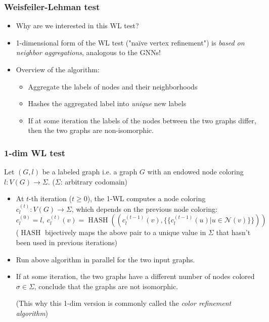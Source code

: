 \documentclass[handout]{beamer}
\DeclareMathOperator{\hash}{HASH}
\begin{document}
\begin{frame}
\frametitle{Weisfeiler-Lehman test}

\begin{itemize}
	\item Why are we interested in this WL test? \pause
	
	\item 1-dimensional form of the WL test ("na\"ive vertex refinement") is {\it based on neighbor aggregations}, analogous to the GNNs! \pause
	
	\item Overview of the algorithm:
	\begin{itemize}
		\item Aggregate the labels of nodes and their neighborhoods
		\item Hashes the aggregated label into {\it unique} new labels
		\item If at some iteration the labels of the nodes between the two graphs differ, then the two graphs are non-isomorphic.
	\end{itemize}
	
\end{itemize}

\end{frame}

\begin{frame}
\frametitle{1-dim WL test}

Let $(G, l)$ be a labeled graph i.e. a graph $G$ with an endowed node coloring $l : V(G) \rightarrow \Sigma$.
($\Sigma$: arbitrary codomain) \pause

\begin{itemize}
	\item At $t$-th iteration ($t \geq 0$), the 1-WL computes a node coloring $c_l^{(t)} : V(G) \rightarrow \Sigma$, which depends on the previous node coloring:
	$$c_l^{(0)} = l, \ c_l^{(t)}(v) = \hash \left( \left( c_l^{(t - 1)}(v), \{\{ c_l^{(t - 1)}(u) | u \in \mathscr{N}(v) \}\} \right) \right)$$	
($\hash$ bijectively maps the above pair to a unique value in $\Sigma$ that hasn't been used in previous iterations)	
	\pause
	
	\item Run above algorithm in parallel for the two input graphs. \pause
	
	\item If at some iteration, the two graphs have a different number of nodes colored $\sigma \in \Sigma$, conclude that the graphs are not isomorphic. \pause
	
	(This why this 1-dim version is commonly called the {\it color refinement algorithm})
\end{itemize}

\end{frame}
\end{document}
